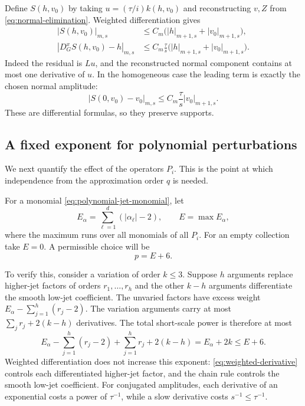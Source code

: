 Define $S(h,v_0)$ by taking $u=(\tau/i)k(h,v_0)$ and reconstructing $v,Z$ from
\eqref{eq:normal-elimination}. Weighted differentiation gives
\begin{align}
 |S(h,v_0)|_{m,s}
 &\leq C_m\bigl(|h|_{m+1,s}+|v_0|_{m+1,s}\bigr),
 \label{eq:first-parametrix-bound}\\
 |D_G^xS(h,v_0)-h|_{m,s}
 &\leq C_m\frac\tau s
      \bigl(|h|_{m+1,s}+|v_0|_{m+1,s}\bigr).
 \label{eq:first-parametrix-error}
\end{align}
Indeed the residual is $Lu$, and the reconstructed normal component contains
at most one derivative of $u$. In the homogeneous case the leading term is
exactly the chosen normal amplitude:
\begin{equation}\label{eq:free-mode-leading}
 |S(0,v_0)-v_0|_{m,s}
 \leq C_m\frac\tau s|v_0|_{m+1,s}.
\end{equation}
These are differential formulas, so they preserve supports.

\subsection{A fixed exponent for polynomial perturbations}

We next quantify the effect of the operators $P_i$. This is the point at which
independence from the approximation order $q$ is needed.

For a monomial \eqref{eq:polynomial-jet-monomial}, let
\[
 E_\alpha=\sum_{\ell=1}^d(|\alpha_\ell|-2),
 \qquad E=\max E_\alpha,
\]
where the maximum runs over all monomials of all $P_i$. For an empty collection
take $E=0$. A permissible choice will be
\begin{equation}\label{eq:fixed-perturbation-power}
 p=E+6.
\end{equation}

To verify this, consider a variation of order $k\leq3$. Suppose $h$ arguments
replace higher-jet factors of orders $r_1,\ldots,r_h$ and the other $k-h$
arguments differentiate the smooth low-jet coefficient. The unvaried factors
have excess weight $E_\alpha-\sum_{j=1}^h(r_j-2)$. The variation arguments
carry at most $\sum_jr_j+2(k-h)$ derivatives. The total short-scale power is
therefore at most
\[
 E_\alpha-\sum_{j=1}^h(r_j-2)+\sum_{j=1}^hr_j+2(k-h)
 =E_\alpha+2k\leq E+6.
\]
Weighted differentiation does not increase this exponent:
\eqref{eq:weighted-derivative} controls each differentiated higher-jet factor,
and the chain rule controls the smooth low-jet coefficient. For conjugated
amplitudes, each derivative of an exponential costs a power of $\tau^{-1}$,
while a slow derivative costs $s^{-1}\leq\tau^{-1}$.


